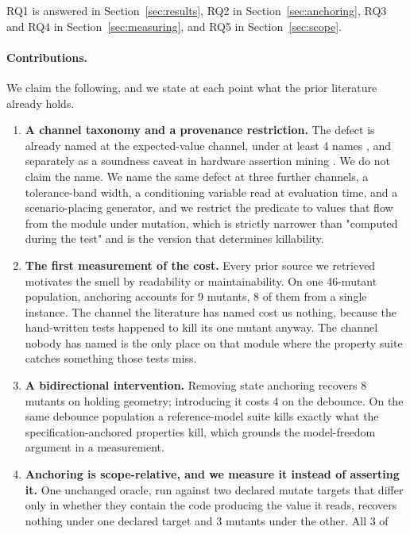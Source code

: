 \documentclass[12pt]{article}
\begin{document}
RQ1 is answered in Section~\ref{sec:results}, RQ2 in Section~\ref{sec:anchoring},
RQ3 and RQ4 in Section~\ref{sec:measuring}, and RQ5 in Section~\ref{sec:scope}.

\paragraph{Contributions.} We claim the following, and we state at each point
what the prior literature already holds.

\begin{enumerate}
\item \textbf{A channel taxonomy and a provenance restriction.} The defect is
      already named at the expected-value channel, under at least 4 names
      \cite{garousi2018,soares2023catalog,rwemalika2021}, and separately as a
      soundness caveat in hardware assertion mining \cite{witharana2022}. We do
      not claim the name. We name the same defect at three further channels, a
      tolerance-band width, a conditioning variable read at evaluation time, and
      a scenario-placing generator, and we restrict the predicate to values that
      flow from the module under mutation, which is strictly narrower than
      "computed during the test" and is the version that determines killability.
\item \textbf{The first measurement of the cost.} Every prior source we
      retrieved motivates the smell by readability or maintainability. On one 46-mutant population,
      anchoring accounts for 9 mutants, 8 of them from a single instance.
      The channel the literature has named cost us nothing, because the
      hand-written tests happened to kill its one mutant anyway. The channel nobody
      has named is the only place on that module where the property suite catches
      something those tests miss.
\item \textbf{A bidirectional intervention.} Removing state anchoring recovers
      8 mutants on holding geometry; introducing it costs 4 on the
      debounce. On the same debounce population a reference-model suite kills
      exactly what the specification-anchored properties kill, which grounds the model-freedom argument in a measurement.
\item \textbf{Anchoring is scope-relative, and we measure it instead of asserting it.} One unchanged oracle, run against two declared mutate targets that
      differ only in whether they contain the code producing the value it reads,
      recovers nothing under one declared target and 3 mutants under the other. All 3 of

\end{enumerate}
\end{document}
